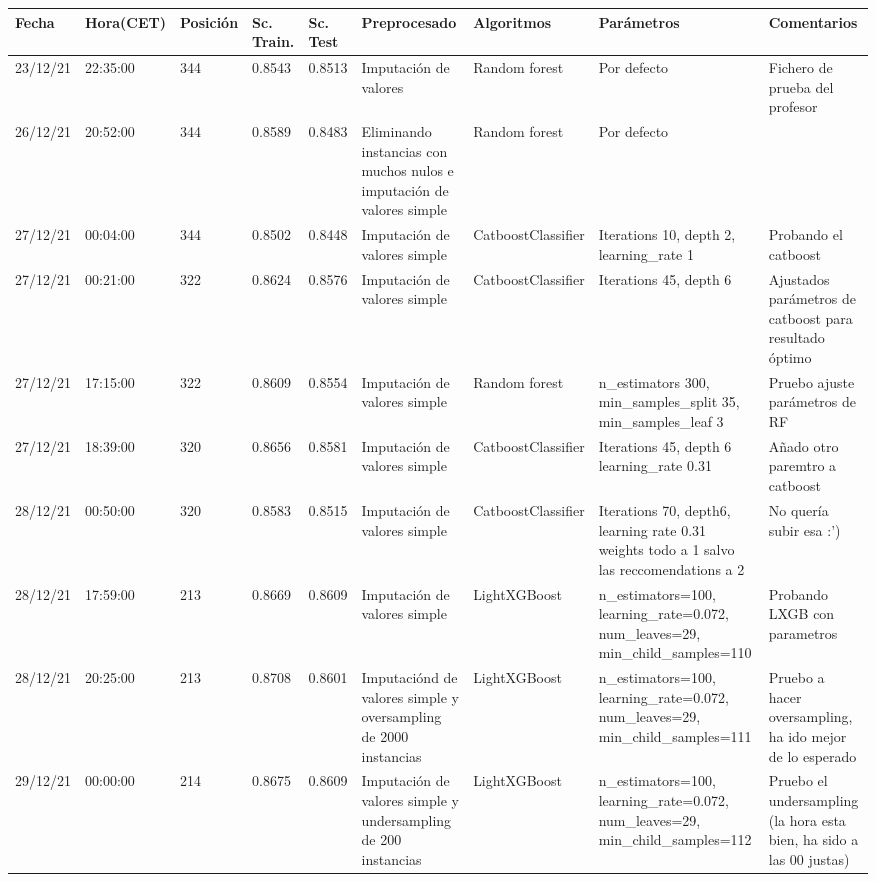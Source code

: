 \documentclass[twoside,openright,titlepage,numbers=noenddot,openany,headinclude,footinclude=true,
cleardoublepage=empty,abstractoff,BCOR=5mm,paper=a4,fontsize=12pt,main=spanish]{scrreprt}
\begin{document}
\tiny
\begin{longtable}{|l|l|l|l|l|m{7em}|m{7em}|m{7em}|m{7em}|}

        Fecha & Hora(CET) & Posición & Sc. Train. & Sc. Test & Preprocesado & Algoritmos & Parámetros & Comentarios \\ \hline
        23/12/21 & 22:35:00 & 344 & 0.8543 & 0.8513 & Imputación de valores & Random forest & Por defecto & Fichero de prueba del profesor \\ \hline
        26/12/21 & 20:52:00 & 344 & 0.8589 & 0.8483 & Eliminando instancias con muchos nulos  e imputación de valores simple & Random forest & Por defecto & ~ \\ \hline
        27/12/21 & 00:04:00 & 344 & 0.8502 & 0.8448 & Imputación de valores simple & CatboostClassifier & Iterations 10, depth 2, learning\_rate 1 & Probando el catboost \\ \hline
        27/12/21 & 00:21:00 & 322 & 0.8624 & 0.8576 & Imputación de valores simple & CatboostClassifier & Iterations 45, depth 6 & Ajustados parámetros de catboost para resultado óptimo \\ \hline
        27/12/21 & 17:15:00 & 322 & 0.8609 & 0.8554 & Imputación de valores simple & Random forest & n\_estimators 300, min\_samples\_split 35, min\_samples\_leaf 3  & Pruebo ajuste parámetros de RF \\ \hline
        27/12/21 & 18:39:00 & 320 & 0.8656 & 0.8581 & Imputación de valores simple & CatboostClassifier & Iterations 45, depth 6 learning\_rate 0.31 & Añado otro paremtro a catboost \\ \hline
        28/12/21 & 00:50:00 & 320 & 0.8583 & 0.8515 & Imputación de valores simple & CatboostClassifier & Iterations 70, depth6,  learning rate 0.31 weights todo a 1 salvo las reccomendations a 2 & No quería subir esa :’) \\ \hline
        28/12/21 & 17:59:00 & 213 & 0.8669 & 0.8609 & Imputación de valores simple & LightXGBoost & n\_estimators=100, learning\_rate=0.072, num\_leaves=29, min\_child\_samples=110 & Probando LXGB con parametros \\ \hline
        28/12/21 & 20:25:00 & 213 & 0.8708 & 0.8601 & Imputaciónd de valores simple y oversampling de 2000 instancias & LightXGBoost & n\_estimators=100, learning\_rate=0.072, num\_leaves=29, min\_child\_samples=111 & Pruebo a hacer oversampling, ha ido mejor de lo esperado \\ \hline
        29/12/21 & 00:00:00 & 214 & 0.8675 & 0.8609 & Imputación de valores simple y undersampling de 200 instancias & LightXGBoost & n\_estimators=100, learning\_rate=0.072, num\_leaves=29, min\_child\_samples=112 & Pruebo el undersampling (la hora esta bien, ha sido a las 00 justas) \\ \hline

\end{longtable}
\end{document}
